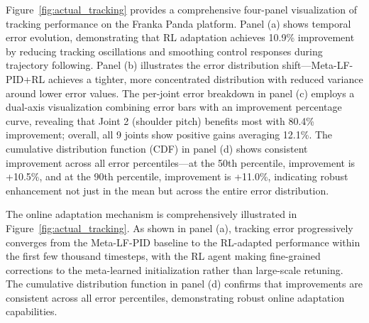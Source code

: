 \documentclass[DTMColor]{ROB-New}
\begin{document}
Figure~\ref{fig:actual_tracking} provides a comprehensive four-panel visualization of tracking performance on the Franka Panda platform. Panel (a) shows temporal error evolution, demonstrating that RL adaptation achieves 10.9\% improvement by reducing tracking oscillations and smoothing control responses during trajectory following. Panel (b) illustrates the error distribution shift—Meta-LF-PID+RL achieves a tighter, more concentrated distribution with reduced variance around lower error values. The per-joint error breakdown in panel (c) employs a dual-axis visualization combining error bars with an improvement percentage curve, revealing that Joint 2 (shoulder pitch) benefits most with 80.4\% improvement; overall, all 9 joints show positive gains averaging 12.1\%. The cumulative distribution function (CDF) in panel (d) shows consistent improvement across all error percentiles—at the 50th percentile, improvement is +10.5\%, and at the 90th percentile, improvement is +11.0\%, indicating robust enhancement not just in the mean but across the entire error distribution.


The online adaptation mechanism is comprehensively illustrated in Figure~\ref{fig:actual_tracking}. As shown in panel (a), tracking error progressively converges from the Meta-LF-PID baseline to the RL-adapted performance within the first few thousand timesteps, with the RL agent making fine-grained corrections to the meta-learned initialization rather than large-scale retuning. The cumulative distribution function in panel (d) confirms that improvements are consistent across all error percentiles, demonstrating robust online adaptation capabilities.

\end{document}
